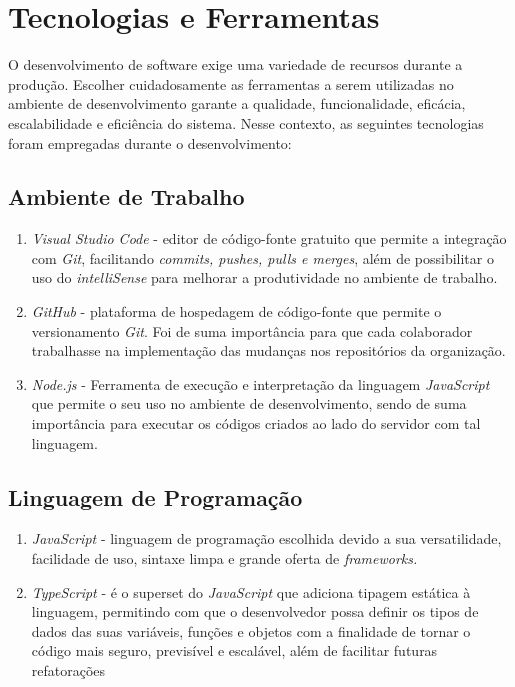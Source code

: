 


\section{Tecnologias e Ferramentas}

O desenvolvimento de software exige uma variedade de recursos durante a produção. Escolher cuidadosamente as ferramentas a serem utilizadas no ambiente de desenvolvimento garante a qualidade, funcionalidade, eficácia, escalabilidade e eficiência do sistema. Nesse contexto, as seguintes tecnologias foram empregadas durante o desenvolvimento: 

\subsection{Ambiente de Trabalho}

\begin{enumerate}
	\item\textit{ Visual Studio Code} - editor de código-fonte gratuito que permite a integração com \textit{Git}, facilitando \textit{commits, pushes, pulls e merges}, além de possibilitar o uso do \textit{intelliSense} para melhorar a produtividade no ambiente de trabalho.
	
	\item \textit{GitHub} -  plataforma de hospedagem de código-fonte que permite o versionamento \textit{ Git}. Foi de suma importância para que cada colaborador trabalhasse na implementação das mudanças nos repositórios da organização.
	
	\item \textit{Node.js} -  Ferramenta de execução e interpretação da linguagem \textit{JavaScript} que permite o seu uso no ambiente de desenvolvimento, sendo de suma importância para executar os códigos criados ao lado do servidor com tal linguagem. 
\end{enumerate}


\subsection{Linguagem de Programação}

\begin{enumerate}
	\item \textit{JavaScript} -   linguagem de programação escolhida devido a sua  versatilidade, facilidade de uso, sintaxe limpa e grande oferta de \textit{frameworks.}
	\item \textit{TypeScript} - é o superset do \textit{JavaScript} que adiciona tipagem estática à linguagem,  permitindo com que o desenvolvedor possa definir os tipos de dados das suas variáveis, funções e objetos com a finalidade de tornar o código mais seguro, previsível e escalável, além de facilitar futuras refatorações

\end{enumerate}

